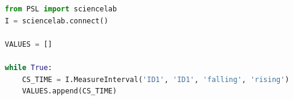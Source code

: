 \begin{lstlisting}[style=CStyle, language=python, caption={Python script to communicate with the PSLab and retrieve the interval measurement}, label={lst:python-pslab}]
from PSL import sciencelab
I = sciencelab.connect()

VALUES = []

while True:
    CS_TIME = I.MeasureInterval('ID1', 'ID1', 'falling', 'rising')
    VALUES.append(CS_TIME)
\end{lstlisting}








